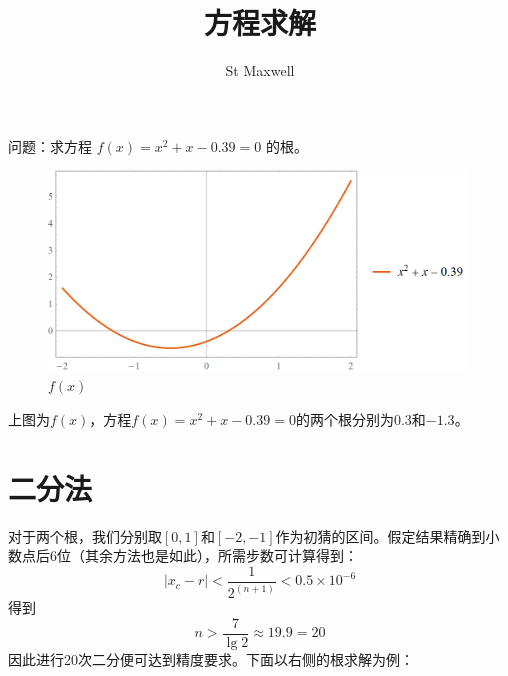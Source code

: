 \documentclass{ctexart}
\title{方程求解}
\author{St Maxwell}
\begin{document}
\maketitle

问题：求方程 $f(x) = x^2 + x - 0.39 = 0 $ 的根。

\begin{figure}[htbp]
  \centering
  \includegraphics[width=30em]{plot1.png}
  \caption{$f(x)$}
  \label{fig:plot1}
\end{figure}

上图为$f(x)$，方程$f(x) = x^2 + x - 0.39 = 0 $的两个根分别为$0.3$和$-1.3$。

\section{二分法}

对于两个根，我们分别取$[0,1]$和$[-2,-1]$作为初猜的区间。假定结果精确到小数点后6位（其余方法也是如此），所需步数可计算得到：
\[
|x_c - r| < \frac{1}{2^{(n+1)}} < 0.5\times10^{-6}
\]
得到
\[
n > \frac{7}{\lg{2}} \approx 19.9 = 20
\]
因此进行20次二分便可达到精度要求。下面以右侧的根求解为例：
\end{document}
